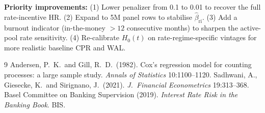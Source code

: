\documentclass[11pt,a4paper]{article}
\begin{document}
\vspace{0.5em}
\textbf{Priority improvements:}
(1) Lower penalizer from 0.1 to 0.01 to recover the full rate-incentive HR.
(2) Expand to 5M panel rows to stabilise $\hat\beta_{\text{ri}}$.
(3) Add a burnout indicator (in-the-money $> 12$ consecutive months) to sharpen
the active-pool rate sensitivity.
(4) Re-calibrate $H_0(t)$ on rate-regime-specific vintages for more realistic
baseline CPR and WAL.

\begin{thebibliography}{9}
\small
{}Andersen, P.\ K.\ and Gill, R.\ D.\ (1982). Cox's regression model for counting processes: a large sample study. \textit{Annals of Statistics} 10:1100--1120.
Sadhwani, A., Giesecke, K.\ and Sirignano, J.\ (2021). \textit{J.\ Financial Econometrics} 19:313--368.
Basel Committee on Banking Supervision (2019). \textit{Interest Rate Risk in the Banking Book}. BIS.
\end{thebibliography}
\end{document}
